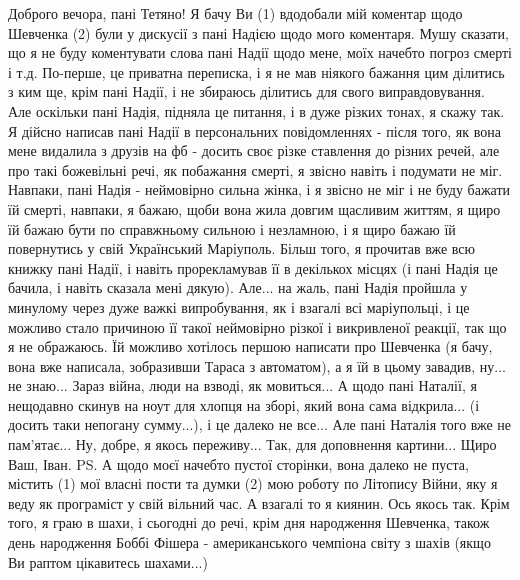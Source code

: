 Доброго вечора, пані Тетяно! Я бачу Ви (1) вдодобали мій коментар щодо Шевченка
(2) були у дискусії з пані Надією щодо мого коментаря. Мушу сказати, що я не
буду коментувати слова пані Надії щодо мене, моїх начебто погроз смерті і т.д.
По-перше, це приватна переписка, і я не мав ніякого бажання цим ділитись з ким
ще, крім пані Надії, і не збираюсь ділитись для свого виправдовування. Але
оскільки пані Надія, підняла це питання, і в дуже різких тонах, я скажу так. Я
дійсно написав пані Надії в персональних повідомленнях - після того, як вона
мене видалила з друзів на фб - досить своє різке ставлення до різних речей, але
про такі божевільні речі, як побажання смерті, я звісно навіть і подумати не
міг. Навпаки, пані Надія - неймовірно сильна жінка, і я звісно не міг і не буду
бажати їй смерті, навпаки, я бажаю, щоби вона жила довгим щасливим життям, я
щиро їй бажаю бути по справжньому сильною і незламною, і я щиро бажаю їй
повернутись у свій Український Маріуполь. Більш того, я прочитав вже всю книжку
пані Надії, і навіть прорекламував її в декількох місцях (і пані Надія це
бачила, і навіть сказала мені дякую). Але... на жаль, пані Надія пройшла у
минулому через дуже важкі випробування, як і взагалі всі маріупольці, і це
можливо стало причиною її такої неймовірно різкої і викривленої реакції, так що
я не ображаюсь. Їй можливо хотілось першою написати про Шевченка (я бачу, вона
вже написала, зобразивши Тараса з автоматом), а я їй в цьому завадив, ну... не
знаю... Зараз війна, люди на взводі, як мовиться... А щодо пані Наталії, я
нещодавно скинув на ноут для хлопця на зборі, який вона сама відкрила... (і
досить таки непогану сумму...), і це далеко не все... Але пані Наталія того вже
не пам'ятає... Ну, добре, я якось переживу...  Так, для доповнення картини...
Щиро Ваш, Іван. PS. А щодо моєї начебто пустої сторінки, вона далеко не пуста,
містить (1) мої власні пости та думки (2) мою роботу по Літопису Війни, яку я
веду як програміст у свій вільний час. А взагалі то я киянин. Ось якось так.
Крім того, я граю в шахи, і сьогодні до речі, крім дня народження Шевченка,
також день народження Боббі Фішера - американського чемпіона світу з шахів
(якщо Ви раптом цікавитесь шахами...)

